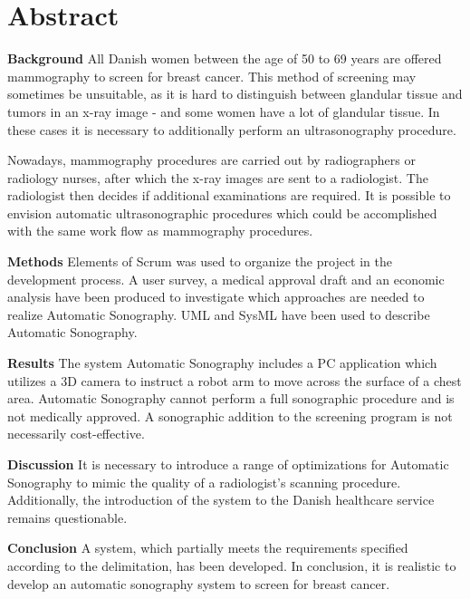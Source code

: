 \chapter{Abstract}\label{kapitel_Abstract}
\textbf{Background} \newline
All Danish women between the age of 50 to 69 years are offered 
mammography to screen for breast cancer. This method of screening may sometimes be unsuitable, as it is hard to distinguish between glandular tissue and tumors in an x-ray image - and some women have a lot of glandular tissue. In these cases it is necessary to additionally perform an ultrasonography procedure.

Nowadays, mammography procedures are carried out by radiographers or radiology nurses, after which the x-ray images are sent to a radiologist. The radiologist then decides if additional examinations are required. It is possible to envision automatic ultrasonographic procedures which could be accomplished with the same work flow as mammography procedures.

\textbf{Methods} \newline
Elements of Scrum was used to organize the project in the development process. A user survey, a medical approval draft and an economic analysis have been produced to investigate which approaches are needed to realize Automatic Sonography. UML and SysML have been used to describe Automatic Sonography.

\textbf{Results} \newline
The system Automatic Sonography includes a PC application which utilizes a 3D camera to instruct a robot arm to move across the surface of a chest area. Automatic Sonography cannot perform a full sonographic procedure and is not medically approved. A sonographic addition to the screening program is not necessarily cost-effective.

\textbf{Discussion}\newline
It is necessary to introduce a range of optimizations for Automatic Sonography to mimic the quality of a radiologist's scanning procedure. Additionally, the introduction of the system to the Danish healthcare service remains questionable.

\textbf{Conclusion} \newline
A system, which partially meets the requirements specified according to the delimitation, has been developed. In conclusion, it is realistic to develop an automatic sonography system to screen for breast cancer.